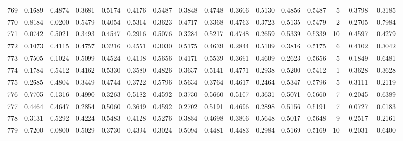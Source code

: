 \begin{tabular}{lrrrrrrrrrrrrrrr}
769 &      0.1689 &  0.4874 &  0.3681 &  0.5174 &  0.4176 &  0.5487 &  0.3848 &  0.4748 &  0.3606 &  0.5130 &   0.4856 &     0.5487 &      5 &                    0.3798 &                     0.3185 \\
770 &      0.8184 &  0.0200 &  0.5479 &  0.4054 &  0.5314 &  0.3623 &  0.4717 &  0.3368 &  0.4763 &  0.3723 &   0.5135 &     0.5479 &      2 &                   -0.2705 &                    -0.7984 \\
771 &      0.0742 &  0.5021 &  0.3493 &  0.4547 &  0.2916 &  0.5076 &  0.3284 &  0.5217 &  0.4748 &  0.2659 &   0.5339 &     0.5339 &     10 &                    0.4597 &                     0.4279 \\
772 &      0.1073 &  0.4115 &  0.4757 &  0.3216 &  0.4551 &  0.3030 &  0.5175 &  0.4639 &  0.2844 &  0.5109 &   0.3816 &     0.5175 &      6 &                    0.4102 &                     0.3042 \\
773 &      0.7505 &  0.1024 &  0.5099 &  0.4524 &  0.4108 &  0.5656 &  0.4171 &  0.5539 &  0.3691 &  0.4609 &   0.2623 &     0.5656 &      5 &                   -0.1849 &                    -0.6481 \\
774 &      0.1784 &  0.5412 &  0.4162 &  0.5330 &  0.3580 &  0.4826 &  0.3637 &  0.5141 &  0.4771 &  0.2938 &   0.5200 &     0.5412 &      1 &                    0.3628 &                     0.3628 \\
775 &      0.2685 &  0.4804 &  0.3449 &  0.4744 &  0.3722 &  0.5796 &  0.5634 &  0.3764 &  0.4617 &  0.2464 &   0.5347 &     0.5796 &      5 &                    0.3111 &                     0.2119 \\
776 &      0.7705 &  0.1316 &  0.4990 &  0.3263 &  0.5182 &  0.4592 &  0.3730 &  0.5660 &  0.5107 &  0.3631 &   0.5071 &     0.5660 &      7 &                   -0.2045 &                    -0.6389 \\
777 &      0.4464 &  0.4647 &  0.2854 &  0.5060 &  0.3649 &  0.4592 &  0.2702 &  0.5191 &  0.4696 &  0.2898 &   0.5156 &     0.5191 &      7 &                    0.0727 &                     0.0183 \\
778 &      0.3131 &  0.5292 &  0.4224 &  0.5483 &  0.4128 &  0.5276 &  0.3884 &  0.4698 &  0.3806 &  0.5648 &   0.5017 &     0.5648 &      9 &                    0.2517 &                     0.2161 \\
779 &      0.7200 &  0.0800 &  0.5029 &  0.3730 &  0.4394 &  0.3024 &  0.5094 &  0.4481 &  0.4483 &  0.2984 &   0.5169 &     0.5169 &     10 &                   -0.2031 &                    -0.6400 \\

\end{tabular}
